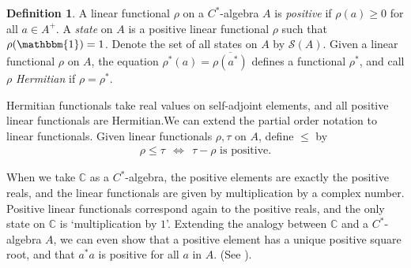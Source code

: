 \documentclass[11pt,a4paper]{report}
\theoremstyle{plain}
\theoremstyle{definition}
\newtheorem{defn}{Definition}
\newcommand{\1}{\mathbbm{1}}
\newcommand{\C}{\mathbb{C}}
\renewcommand{\S}{\mathscr{S}}
\renewcommand{\bar}{\overline}
\begin{document}
\begin{defn}
	A linear functional $\rho$ on a $C^\ast$-algebra $A$ is \emph{positive} if 
	$\rho(a)\geq 0$ for all $a\in A^+$. A \emph{state} on $A$ is a positive linear 
	functional $\rho$ such that $\rho(\1)=1$. Denote the set of all states on $A$ by 
	$\S(A)$. Given a linear functional $\rho$ on $A$, the equation $\rho^\ast(a) 
	=\bar{\rho(a^\ast)}$ defines a functional $\rho^\ast$, and call $\rho$ 
	\emph{Hermitian} if $\rho=\rho^\ast$.

\end{defn}
Hermitian functionals take real values on self-adjoint elements, and all 
positive linear functionals are Hermitian.We can extend the partial order 
notation to linear functionals. Given linear functionals $\rho,\tau$ on $A$, 
define $\leq$ by
\begin{align*}
	\rho \leq \tau ~~\iff~~ \tau - \rho \mbox{ is positive}.
\end{align*}

When we take $\C$ as a $C^\ast$-algebra, the positive elements are exactly the 
positive reals, and the linear functionals are given by multiplication by a 
complex number. Positive linear functionals correspond again to the positive 
reals, and the only state on $\C$ is `multiplication by $1$'.
Extending the analogy between $\C$ and a $C^\ast$-algebra $A$, we can even show 
that a positive element has a unique positive square root, and that $a^\ast a$ 
is positive for all $a$ in $A$. (See \cite[4.2.5 and 4.2.6]{kadison83}).
\end{document}
